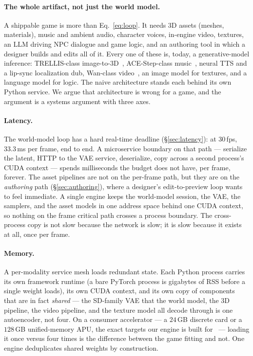 \documentclass[11pt]{article}
\newcommand{\fps}[1]{\mbox{#1\,fps}}
\begin{document}
\paragraph{The whole artifact, not just the world model.} A shippable game is more than
Eq.~\eqref{eq:loop}. It needs 3D assets (meshes, materials), music and ambient audio, character voices,
in-engine video, textures, an LLM driving NPC dialogue and game logic, and an authoring tool in which a
designer builds and edits all of it. Every one of these is, today, a generative-model inference: TRELLIS-class
image-to-3D~\cite{trellis}, ACE-Step-class music~\cite{acestep}, neural TTS and a lip-sync localization dub,
Wan-class video~\cite{wan}, an image model for textures, and a language model for logic. The naive
architecture stands each behind its own Python service. We argue that architecture is wrong for a game, and
the argument is a systems argument with three axes.

\paragraph{Latency.} The world-model loop has a hard real-time deadline (\S\ref{sec:latency}): at \fps{30},
$33.3$\,ms per frame, end to end. A microservice boundary on that path --- serialize the latent, HTTP to the
VAE service, deserialize, copy across a second process's CUDA context --- spends milliseconds the budget does
not have, per frame, forever. The asset pipelines are not on the per-frame path, but they are on the
\emph{authoring} path (\S\ref{sec:authoring}), where a designer's edit-to-preview loop wants to feel
immediate. A single engine keeps the world-model session, the VAE, the samplers, and the asset models in one
address space behind one CUDA context, so nothing on the frame critical path crosses a process boundary. The
cross-process copy is not slow because the network is slow; it is slow because it exists at all, once per
frame.

\paragraph{Memory.} A per-modality service mesh loads redundant state. Each Python process carries its own
framework runtime (a bare PyTorch process is gigabytes of RSS before a single weight loads), its own CUDA
context, and its own copy of components that are in fact \emph{shared} --- the SD-family VAE that the world
model, the 3D pipeline, the video pipeline, and the texture model all decode through is one autoencoder, not
four. On a consumer accelerator --- a $24$\,GB discrete card or a $128$\,GB unified-memory APU, the exact
targets our engine is built for~\cite{backend} --- loading it once versus four times is the difference between
the game fitting and not. One engine deduplicates shared weights by construction.
\end{document}
